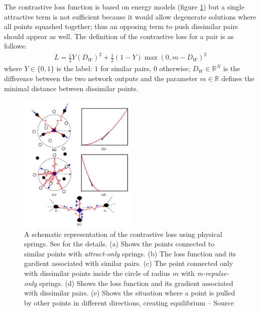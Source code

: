 \documentclass[a4paper,12pt]{report}
\newcommand{\R}{\mathbb{R}}
\begin{document}
The contrastive loss function is based on energy models (figure \ref{fig:contrastive_spring}) but a single attractive term is not sufficient because it would allow degenerate solutions where all points squashed together; thus an opposing term to push dissimilar pairs should appear as well.
The definition of the contrastive loss for a pair is as follows:
\begin{eqnarray}
    L = \frac{1}{2} Y (D_W)^2 + \frac{1}{2} (1-Y) \max(0, m - D_W)^2
\end{eqnarray}
where $Y \in \{0,1\}$ is the label: $1$ for similar pairs, $0$ otherwise; $D_W \in \R^N$ is the difference between the two network outputs and the parameter $m \in \R$ defines the minimal distance between dissimilar points.

\begin{figure}[h]
    \begin{center}
        \includegraphics[width=0.5\textwidth]{thesis_figures/contrastive_spring.jpg}
    \end{center}
    \caption{A schematic representation of the contrastive loss using physical springs. See \cite{hadsell2006dimensionality} for the details. (a) Shows the points connected to similar points with {\em attract-only} springs. (b) The loss function and its gardient associated with similar pairs. (c) The point connected only with dissimilar points inside the circle of radius $m$ with {\em m-repulse-only} springs. (d) Shows the loss function and its gradient associated with dissimilar pairs. (e) Shows the situation where a point is pulled by other points in different directions, creating equilibrium -- Source \cite{hadsell2006dimensionality}}
    \label{fig:contrastive_spring}
\end{figure}
\end{document}
